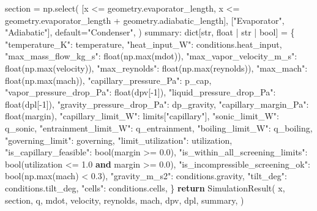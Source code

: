 \documentclass[
  12pt,
  12pt,a4paper,oneside]{report}
\newenvironment{Shaded}{}{}
\newcommand{\BuiltInTok}[1]{\textcolor[rgb]{0.00,0.50,0.00}{#1}}
\newcommand{\ControlFlowTok}[1]{\textcolor[rgb]{0.00,0.44,0.13}{\textbf{#1}}}
\newcommand{\DecValTok}[1]{\textcolor[rgb]{0.25,0.63,0.44}{#1}}
\newcommand{\FloatTok}[1]{\textcolor[rgb]{0.25,0.63,0.44}{#1}}
\newcommand{\KeywordTok}[1]{\textcolor[rgb]{0.00,0.44,0.13}{\textbf{#1}}}
\newcommand{\NormalTok}[1]{#1}
\newcommand{\OperatorTok}[1]{\textcolor[rgb]{0.40,0.40,0.40}{#1}}
\newcommand{\StringTok}[1]{\textcolor[rgb]{0.25,0.44,0.63}{#1}}
\begin{document}
\begin{Shaded}
\begin{Highlighting}[]
\NormalTok{    section }\OperatorTok{=}\NormalTok{ np.select(}
\NormalTok{        [x }\OperatorTok{\textless{}=}\NormalTok{ geometry.evaporator\_length,}
\NormalTok{         x }\OperatorTok{\textless{}=}\NormalTok{ geometry.evaporator\_length }\OperatorTok{+}\NormalTok{ geometry.adiabatic\_length],}
\NormalTok{        [}\StringTok{"Evaporator"}\NormalTok{, }\StringTok{"Adiabatic"}\NormalTok{], default}\OperatorTok{=}\StringTok{"Condenser"}\NormalTok{,}
\NormalTok{    )}
\NormalTok{    summary: }\BuiltInTok{dict}\NormalTok{[}\BuiltInTok{str}\NormalTok{, }\BuiltInTok{float} \OperatorTok{|} \BuiltInTok{str} \OperatorTok{|} \BuiltInTok{bool}\NormalTok{] }\OperatorTok{=}\NormalTok{ \{}
        \StringTok{"temperature\_K"}\NormalTok{: temperature,}
        \StringTok{"heat\_input\_W"}\NormalTok{: conditions.heat\_input,}
        \StringTok{"max\_mass\_flow\_kg\_s"}\NormalTok{: }\BuiltInTok{float}\NormalTok{(np.}\BuiltInTok{max}\NormalTok{(mdot)),}
        \StringTok{"max\_vapor\_velocity\_m\_s"}\NormalTok{: }\BuiltInTok{float}\NormalTok{(np.}\BuiltInTok{max}\NormalTok{(velocity)),}
        \StringTok{"max\_reynolds"}\NormalTok{: }\BuiltInTok{float}\NormalTok{(np.}\BuiltInTok{max}\NormalTok{(reynolds)),}
        \StringTok{"max\_mach"}\NormalTok{: }\BuiltInTok{float}\NormalTok{(np.}\BuiltInTok{max}\NormalTok{(mach)),}
        \StringTok{"capillary\_pressure\_Pa"}\NormalTok{: p\_cap,}
        \StringTok{"vapor\_pressure\_drop\_Pa"}\NormalTok{: }\BuiltInTok{float}\NormalTok{(dpv[}\OperatorTok{{-}}\DecValTok{1}\NormalTok{]),}
        \StringTok{"liquid\_pressure\_drop\_Pa"}\NormalTok{: }\BuiltInTok{float}\NormalTok{(dpl[}\OperatorTok{{-}}\DecValTok{1}\NormalTok{]),}
        \StringTok{"gravity\_pressure\_drop\_Pa"}\NormalTok{: dp\_gravity,}
        \StringTok{"capillary\_margin\_Pa"}\NormalTok{: }\BuiltInTok{float}\NormalTok{(margin),}
        \StringTok{"capillary\_limit\_W"}\NormalTok{: limits[}\StringTok{"capillary"}\NormalTok{],}
        \StringTok{"sonic\_limit\_W"}\NormalTok{: q\_sonic,}
        \StringTok{"entrainment\_limit\_W"}\NormalTok{: q\_entrainment,}
        \StringTok{"boiling\_limit\_W"}\NormalTok{: q\_boiling,}
        \StringTok{"governing\_limit"}\NormalTok{: governing,}
        \StringTok{"limit\_utilization"}\NormalTok{: utilization,}
        \StringTok{"is\_capillary\_feasible"}\NormalTok{: }\BuiltInTok{bool}\NormalTok{(margin }\OperatorTok{\textgreater{}=} \FloatTok{0.0}\NormalTok{),}
        \StringTok{"is\_within\_all\_screening\_limits"}\NormalTok{: }\BuiltInTok{bool}\NormalTok{(utilization }\OperatorTok{\textless{}=} \FloatTok{1.0} \KeywordTok{and}\NormalTok{ margin }\OperatorTok{\textgreater{}=} \FloatTok{0.0}\NormalTok{),}
        \StringTok{"is\_incompressible\_screening\_ok"}\NormalTok{: }\BuiltInTok{bool}\NormalTok{(np.}\BuiltInTok{max}\NormalTok{(mach) }\OperatorTok{\textless{}} \FloatTok{0.3}\NormalTok{),}
        \StringTok{"gravity\_m\_s2"}\NormalTok{: conditions.gravity,}
        \StringTok{"tilt\_deg"}\NormalTok{: conditions.tilt\_deg,}
        \StringTok{"cells"}\NormalTok{: conditions.cells,}
\NormalTok{    \}}
    \ControlFlowTok{return}\NormalTok{ SimulationResult(}
\NormalTok{        x, section, q, mdot, velocity, reynolds, mach, dpv, dpl, summary,}
\NormalTok{    )}



\end{Highlighting}
\end{Shaded}
\end{document}
